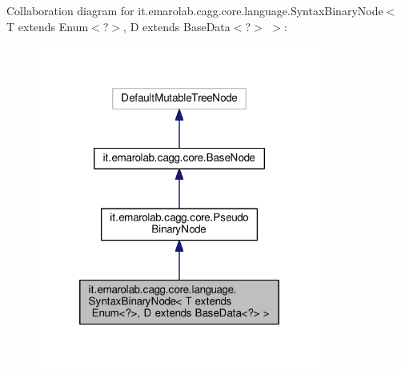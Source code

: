 Collaboration diagram for it.\-emarolab.\-cagg.\-core.\-language.\-Syntax\-Binary\-Node$<$ T extends Enum$<$?$>$, D extends Base\-Data$<$?$>$ $>$\-:\nopagebreak
\begin{figure}[H]
\begin{center}
\leavevmode
\includegraphics[width=264pt]{classit_1_1emarolab_1_1cagg_1_1core_1_1language_1_1SyntaxBinaryNode_3_01T_01extends_01Enum_3_04_8be43688b27d276e2f49cc50b3f1b6e9}
\end{center}
\end{figure}
